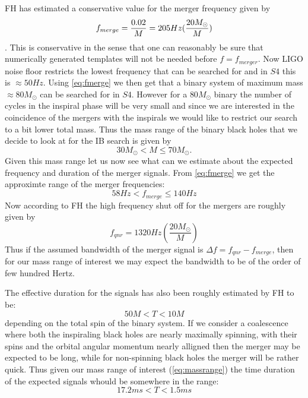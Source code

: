 \documentclass{article}
\begin{document}
FH has estimated a conservative value for the merger frequency given
by 
\begin{equation}
f_{merge} = \frac{0.02}{M} \\
          = 205 Hz (\frac{20M_{\odot}}{M})
\label{eq:fmerge}
\end{equation}.
This is conservative in the sense that one can reasonably be sure that
numerically generated templates will not be needed before $f = f_{merger}$.
Now LIGO noise floor restricts the lowest frequency that can be searched 
for and in $S4$ this is $\approx 50 Hz$. Using \eqref{eq:fmerge} we 
then get that a binary system of maximum mass $\approx 80M_{\odot}$ 
can be searched for in $S4$.  However for a $80 M_{\odot}$ binary the 
number of cycles in the inspiral phase will be very small and since we
are interested in the coincidence of the mergers with the inspirals we
would like to restrict our search to a bit lower total mass.  Thus the 
mass range of the binary black holes that we decide to look at for the 
IB search is given by 
\begin{equation}
30 M_{\odot} < M \leq 70 M_{\odot}. 
\label{eq:massrange}
\end{equation}
Given this mass range let us now see what can we estimate about the 
expected frequency and duration of the merger signals. From 
\eqref{eq:fmerge} we get the approximte range of the merger frequencies:
\begin{equation}
58 Hz < f_{merge} \leq 140 Hz
\label{eq:frange}
\end{equation}
Now according to FH the high frequency shut off for the mergers are
roughly given by 
\begin{equation}
f_{qnr} = 1320 Hz (\frac{20M_{\odot}}{M})
\label{eq:fqnr}
\end{equation}
Thus if the assumed bandwidth of the merger signal is 
$\Delta f = f_{qnr} - f_{merge}$,  then for our mass range of 
interest we may expect the bandwidth to be of the order of few
hundred Hertz.  

The effective duration for the signals has also been roughly estimated
by FH to be:
\begin{equation}
50 M < T < 10 M
\label{eq:timerange}
\end{equation}
depending on the total spin of the binary system. If we consider
a coalescence where both the inspiraling black holes are nearly
maximally spinning, with their spins and the orbital angular momentum
nearly alligned then the merger may be expected to be long,  while
for non-spinning black holes the merger will be rather quick.  Thus 
given our mass range of interest (\eqref{eq:massrange}) the 
time duration of the expected signals whould be somewhere in the 
range:
\begin{equation}
17.2 ms < T < 1.5 ms
\label{eq:trange}
\end{equation} 
  
\end{document}
